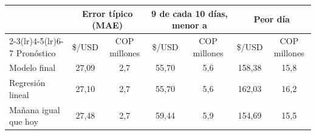 \begin{tabular}{lcccccc}
\toprule
 & \multicolumn{2}{c}{Error típico (MAE)} & \multicolumn{2}{c}{9 de cada 10 días, menor a} & \multicolumn{2}{c}{Peor día} \\
\cmidrule(lr){2-3}\cmidrule(lr){4-5}\cmidrule(lr){6-7}
Pronóstico & \$/USD & COP millones & \$/USD & COP millones & \$/USD & COP millones \\
\midrule
Modelo final & 27,09 & 2,7 & 55,70 & 5,6 & 158,38 & 15,8 \\
Regresión lineal & 27,10 & 2,7 & 55,70 & 5,6 & 162,03 & 16,2 \\
Mañana igual que hoy & 27,48 & 2,7 & 59,44 & 5,9 & 154,69 & 15,5 \\
\bottomrule
\end{tabular}
